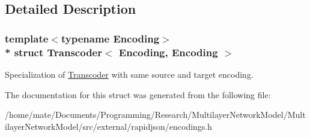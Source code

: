 \subsection{Detailed Description}
\subsubsection*{template$<$typename Encoding$>$\\*
struct Transcoder$<$ Encoding, Encoding $>$}

Specialization of \hyperlink{structTranscoder}{Transcoder} with same source and target encoding. 

The documentation for this struct was generated from the following file\+:\begin{DoxyCompactItemize}
\item 
/home/mate/\+Documents/\+Programming/\+Research/\+Multilayer\+Network\+Model/\+Multilayer\+Network\+Model/src/external/rapidjson/encodings.\+h\end{DoxyCompactItemize}
